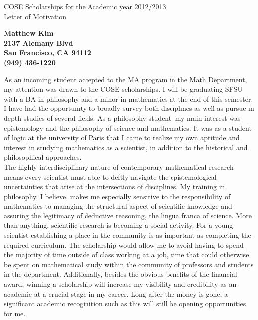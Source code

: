 \documentclass[11pt]{letter} %
\begin{document}
\signature{Matthew Kim}                  %
\longindentation=0pt                       %
\let\raggedleft\raggedright                %
 
\begin{letter}{COSE Scholarships for the Academic year 2012/2013\\
 Letter of Motivation} 

\begin{center}
\large\bf Matthew Kim\\
2137 Alemany Blvd\\ San Francisco, CA 94112\\ (949) 436-1220
\end{center} 
\vfill %

\opening{} 

	As an incoming student accepted to the MA program in the Math Department, my attention was drawn to the COSE scholarships.   I will be graduating SFSU with a BA in philosophy and a minor in mathematics at the end of this semester. I have had the opportunity to broadly survey both disciplines as well as pursue in depth studies of several fields. As a philosophy student, my main interest was epistemology and the philosophy of science and mathematics.  It was as a student of logic at the university of Paris that I came to realize my own aptitude and interest in studying mathematics as a scientist, in addition to the historical and philosophical approaches. \\
	 
	The highly interdisciplinary nature of contemporary mathematical research means every scientist must able to deftly navigate the epistemological uncertainties that arise at the intersections of disciplines.  My training in philosophy, I believe, makes me especially sensitive to the responsibility of mathematics to managing the structural aspect of scientific knowledge and assuring the legitimacy of deductive reasoning, the lingua franca of science.  More than anything, scientific research is becoming a social activity.   For a young scientist establishing a place in the community is as important as completing the required curriculum.  The scholarship would allow me to avoid having to spend the majority of time outside of class working at a job, time that could otherwise be spent on mathematical study within the community of professors and students in the department.  Additionally, besides the obvious benefits of the financial award, winning a scholarship will increase my visibility and credibility as an academic at a crucial stage in my career.  Long after the money is gone, a significant academic recoginition such as this will still be opening opportunities for me.  \\
	

\end{letter}
\end{document}
